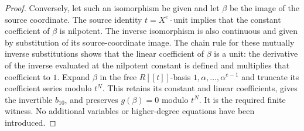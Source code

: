 \begin{proof}
Conversely, let such an isomorphism be given and let $\beta$ be
the image of the source coordinate. The source identity
$t=X^e\cdot\text{unit}$ implies that the constant coefficient
of $\beta$ is nilpotent. The inverse isomorphism is also
continuous and given by substitution of its source-coordinate
image. The chain rule for these mutually inverse substitutions
shows that the linear coefficient of $\beta$ is a unit: the
derivative of the inverse evaluated at the nilpotent constant
is defined and multiplies that coefficient to $1$.
Expand $\beta$ in the free $R[[t]]$-basis
$1,\alpha,\ldots,\alpha^{e-1}$ and truncate its coefficient
series modulo $t^N$. This retains its constant and linear
coefficients, gives the invertible $b_{10}$, and preserves
$g(\beta)=0$ modulo $t^N$. It is the required finite witness.
No additional variables or higher-degree equations have been
introduced.
\end{proof}
